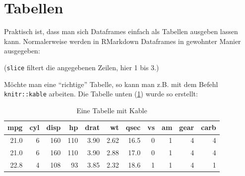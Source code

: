 \documentclass[12pt,]{book}
\makeatletter
\newenvironment{Shaded}{\begin{snugshade}}{\end{snugshade}}
\newcommand{\KeywordTok}[1]{\textcolor[rgb]{0.13,0.29,0.53}{\textbf{{#1}}}}
\newcommand{\DataTypeTok}[1]{\textcolor[rgb]{0.13,0.29,0.53}{{#1}}}
\newcommand{\DecValTok}[1]{\textcolor[rgb]{0.00,0.00,0.81}{{#1}}}
\newcommand{\StringTok}[1]{\textcolor[rgb]{0.31,0.60,0.02}{{#1}}}
\newcommand{\CommentTok}[1]{\textcolor[rgb]{0.56,0.35,0.01}{\textit{{#1}}}}
\newcommand{\NormalTok}[1]{{#1}}
\newenvironment{kframe}{%
\medskip{}
\setlength{\fboxsep}{.8em}
 \def\at@end@of@kframe{}%
 \ifinner\ifhmode%
  \def\at@end@of@kframe{\end{minipage}}%
  \begin{minipage}{\columnwidth}%
 \fi\fi%
 \def\FrameCommand##1{\hskip\@totalleftmargin \hskip-\fboxsep
 \colorbox{shadecolor}{##1}\hskip-\fboxsep
     \hskip-\linewidth \hskip-\@totalleftmargin \hskip\columnwidth}%
 \MakeFramed {\advance\hsize-\width
   \@totalleftmargin\z@ \linewidth\hsize
   \@setminipage}}%
 {\par\unskip\endMakeFramed%
 \at@end@of@kframe}
\renewenvironment{Shaded}{\begin{kframe}}{\end{kframe}}
\makeatother
\begin{document}
\section{Tabellen}\label{tabellen}

Praktisch ist, dass man sich Dataframes einfach als Tabellen ausgeben
lassen kann. Normalerweise werden in RMarkdown Dataframes in gewohnter
Manier ausgegeben:

\begin{Shaded}
\end{Shaded}

(\texttt{slice} filtert die angegebenen Zeilen, hier 1 bis 3.)

Möchte man eine ``richtige'' Tabelle, so kann man z.B. mit dem Befehl
\texttt{knitr::kable} arbeiten. Die Tabelle unten (\ref{tab:kable})
wurde so erstellt:

\begin{Shaded}
\end{Shaded}

\begin{table}

\caption{\label{tab:kable}Eine Tabelle mit Kable}
\centering
\begin{tabular}[t]{r|r|r|r|r|r|r|r|r|r|r}
\hline
mpg & cyl & disp & hp & drat & wt & qsec & vs & am & gear & carb\\
\hline
21.0 & 6 & 160 & 110 & 3.90 & 2.62 & 16.5 & 0 & 1 & 4 & 4\\
\hline
21.0 & 6 & 160 & 110 & 3.90 & 2.88 & 17.0 & 0 & 1 & 4 & 4\\
\hline
22.8 & 4 & 108 & 93 & 3.85 & 2.32 & 18.6 & 1 & 1 & 4 & 1\\
\hline
\end{tabular}
\end{table}
\end{document}
